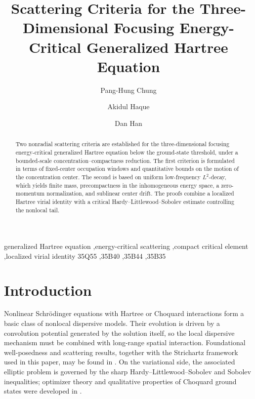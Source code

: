\documentclass[preprint,12pt]{elsarticle}
\numberwithin{equation}{section}
\theoremstyle{remark}
\begin{document}
\begin{frontmatter}

\title{Scattering Criteria for the Three-Dimensional Focusing Energy-Critical Generalized Hartree Equation}

\author[aff1]{Pang-Hung Chung}

\author[aff2]{Akidul Haque}

\author[aff2]{Dan Han}

\address[aff1]{Department of Applied Mathematics, Guangdong University of Education, Guangzhou 510640, P. R. China}
\address[aff2]{Department of Mathematics, University of Louisville, Louisville, KY 40245, USA}

\begin{abstract}
Two nonradial scattering criteria are established for the three-dimensional focusing energy-critical generalized Hartree equation below the ground-state threshold, under a bounded-scale concentration--compactness reduction. The first criterion is formulated in terms of fixed-center occupation windows and quantitative bounds on the motion of the concentration center. The second is based on uniform low-frequency \(L^2\)-decay, which yields finite mass, precompactness in the inhomogeneous energy space, a zero-momentum normalization, and sublinear center drift. The proofs combine a localized Hartree virial identity with a critical Hardy--Littlewood--Sobolev estimate controlling the nonlocal tail.
\end{abstract}

\begin{keyword}
generalized Hartree equation \sep energy-critical scattering \sep compact critical element \sep localized virial identity
\MSC[2020] 35Q55 \sep 35B40 \sep 35B44 \sep 35B35
\end{keyword}

\end{frontmatter}

\section{Introduction}

Nonlinear Schr\"odinger equations with Hartree or Choquard interactions form a basic class of nonlocal dispersive models.  Their evolution is driven by a convolution potential generated by the solution itself, so the local dispersive mechanism must be combined with long-range spatial interaction.  Foundational well-posedness and scattering results, together with the Strichartz framework used in this paper, may be found in \cite{HayashiTsutsumi1987,GinibreVelo2000,Cazenave2003,KeelTao1998}.  On the variational side, the associated elliptic problem is governed by the sharp Hardy--Littlewood--Sobolev and Sobolev inequalities; optimizer theory and qualitative properties of Choquard ground states were developed in \cite{Lieb1983,Aubin1976,Talenti1976,MorozVanSchaftingen2013,LiLiuTangXu2026}.
\end{document}
